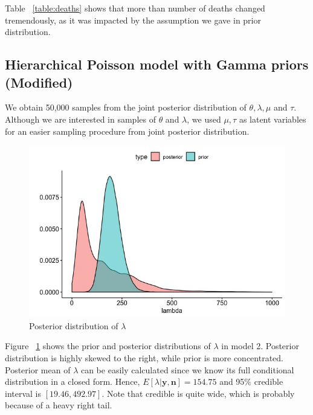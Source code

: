 \documentclass[11pt,twocolumn]{asaproc}
\begin{document}
Table ~\ref{table:deaths} shows that more than number of deaths changed tremendously, as it was impacted by the assumption we gave in prior distribution.









\subsection{Hierarchical Poisson model with Gamma priors (Modified)}
We obtain 50,000 samples from the joint posterior distribution of $\theta, \lambda, \mu$ and $\tau$. Although we are interested in samples of $\theta$ and $\lambda$, we used $\mu, \tau$ as latent variables for an easier sampling procedure from joint posterior distribution. 

\begin{figure}[t]
\centering\includegraphics[scale=.30]{lambdass.jpeg}
\caption{Posterior distribution of $\lambda$}
\label{fig:lambdass}
\end{figure}

Figure ~\ref{fig:lambdass} shows the prior and posterior distributions of $\lambda$ in model 2. Posterior distribution is highly skewed to the right, while prior is more concentrated. Posterior mean of $\lambda$ can be easily calculated since we know its full conditional distribution in a closed form. Hence, $E[\lambda |\mathbf{y, n}] = 154.75$ and 95\% credible interval is $[19.46, 492.97]$. Note that credible is quite wide, which is probably because of a heavy right tail. 
\end{document}
